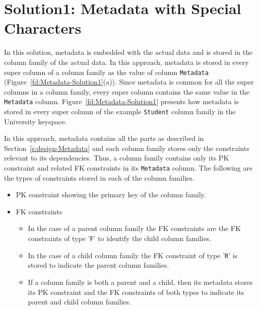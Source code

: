 
\section{Solution1:  Metadata with Special Characters} \label{s:design-sol1}

In this  solution,   metadata is embedded with the actual data and is
stored in the column family of the actual data.  In this approach,  metadata is
stored in every super column of a column family  as the value of column
\texttt{Metadata} (Figure~\ref{fd:Metadata-Solution1}(a)).  Since metadata is
common for all the super columns in a column family,  every super column
contains the same  value in the \texttt{Metadata} column. 
Figure~\ref{fd:Metadata-Solution1} presents how metadata is stored in every
super column of the example \texttt{Student} column family in the University
keyspace. 
	

		
In this approach,  metadata contains all the parts as 
described in Section~\ref{s:design-Metadata} and each column family stores only
the constraints relevant to its dependencies.  Thus,  a column family contains
only its \ac{PK} constraint and related \ac{FK} constraints in its
\texttt{Metadata} column.  The following are the types of constraints stored in
each of the column families. 
	
		\begin{itemize}
		  \item  \ac{PK} constraint showing the primary key of the column family. 
		  \item \ac{FK} constraints 
				\begin{itemize}
					\item In the case of a parent column family the \ac{FK} constraints are the
					\ac{FK} constraints of type '\texttt{F}' to identify the child column
					families. 
					\item  In the case of a child column family the \ac{FK} constraint of type
					'\texttt{R}' is stored to indicate the parent column families. 
					\item If a column family is both a parent and a child,  then its metadata
					stores its \ac{PK} constraint and the \ac{FK} constraints of both types to
					indicate its parent and child column families. 
				\end{itemize}
		\end{itemize}
		

